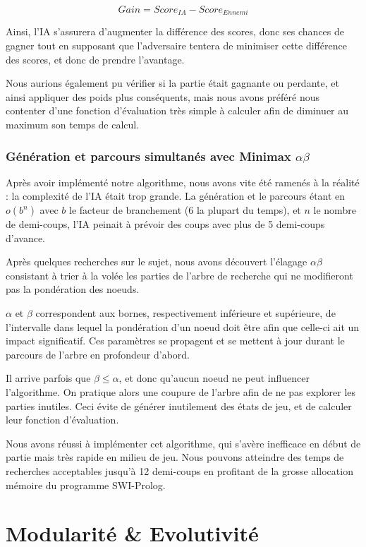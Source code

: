 \documentclass[]{article}
\begin{document}
$$Gain = Score_{IA} - Score_{Ennemi}$$

Ainsi, l'IA s'assurera d'augmenter la différence des scores, donc ses chances de gagner tout en supposant que l'adversaire tentera de minimiser cette différence des scores, et donc de prendre l'avantage.

Nous aurions également pu vérifier si la partie était gagnante ou perdante, et ainsi appliquer des poids plus conséquents, mais nous avons préféré nous contenter d'une fonction d'évaluation très simple à calculer afin de diminuer au maximum son temps de calcul.

\subsubsection{Génération et parcours simultanés avec Minimax $\alpha\beta$}

Après avoir implémenté notre algorithme, nous avons vite été ramenés à la réalité : la complexité de l'IA était trop grande. La génération et le parcours étant en $o(b^{n})$ avec $b$ le facteur de branchement (6 la plupart du temps), et $n$ le nombre de demi-coups, l'IA peinait à prévoir des coups avec plus de 5 demi-coups d'avance.

Après quelques recherches sur le sujet, nous avons découvert l'élagage $\alpha\beta$ consistant à trier à la volée les parties de l'arbre de recherche qui ne modifieront pas la pondération des noeuds.

$\alpha$ et $\beta$ correspondent aux bornes, respectivement inférieure et supérieure, de l'intervalle dans lequel la pondération d'un noeud doit être afin que celle-ci ait un impact significatif. Ces paramètres se propagent et se mettent à jour durant le parcours de l'arbre en profondeur d'abord.

Il arrive parfois que $\beta \leq \alpha$, et donc qu'aucun noeud ne peut influencer l'algorithme. On pratique alors une coupure de l'arbre afin de ne pas explorer les parties inutiles. Ceci évite de générer inutilement des états de jeu, et de calculer leur fonction d'évaluation.

Nous avons réussi à implémenter cet algorithme, qui s'avère inefficace en début de partie mais très rapide en milieu de jeu. Nous pouvons atteindre des temps de recherches acceptables jusqu'à 12 demi-coups en profitant de la grosse allocation mémoire du programme SWI-Prolog.


\section{Modularité \& Evolutivité}
\end{document}
